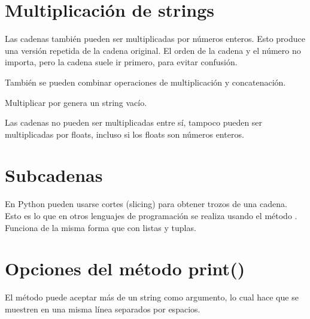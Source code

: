 \section{Multiplicación de strings}

Las cadenas también pueden ser multiplicadas por números enteros.
Esto produce una versión repetida de la cadena original.
El orden de la cadena y el número no importa, pero la cadena suele ir primero, para evitar confusión.


También se pueden combinar operaciones de multiplicación y concatenación.


Multiplicar por  genera un string vacío.


Las cadenas no pueden ser multiplicadas entre sí, tampoco pueden ser multiplicadas por floats, incluso si los floats son números enteros.


\section{Subcadenas}

En Python pueden usarse cortes (slicing) para obtener trozos de una cadena.
Esto es lo que en otros lenguajes de programación se realiza usando el método .
Funciona de la misma forma que con listas y tuplas.



\section{Opciones del método print()}

El método  puede aceptar más de un string como argumento, lo cual hace que se muestren en una misma línea separados por espacios.

